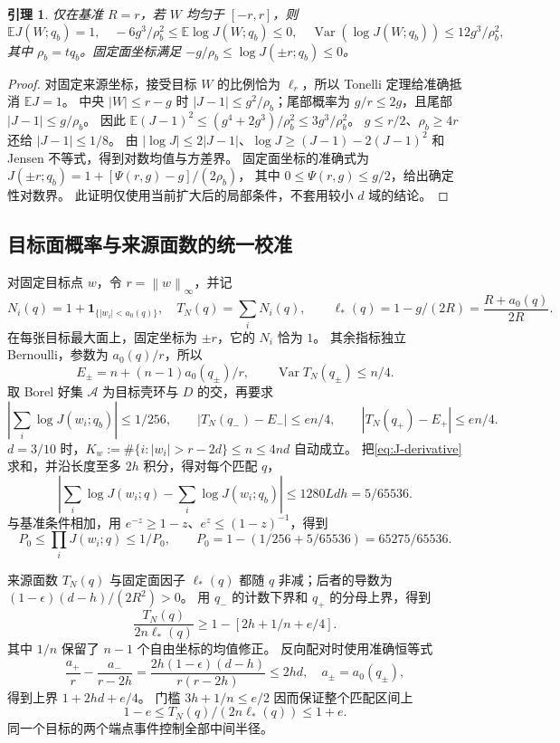 \documentclass[UTF8,a4paper,11pt,fontset=fandol]{ctexart}
\newtheorem{lemma}{引理}[section]
\theoremstyle{remark}
\newcommand{\one}{\mathbf 1}
\newcommand{\norm}[1]{\left\lVert#1\right\rVert}
\begin{document}
\begin{lemma}\label{lem:J-baseline}
仅在基准 $R=r$，若 $W$ 均匀于 $[-r,r]$，则
\[
 \mathbb EJ(W;q_b)=1,\quad
 -6g^3/\rho_b^2\le\mathbb E\log J(W;q_b)\le0,\quad
 \operatorname{Var}(\log J(W;q_b))\le12g^3/\rho_b^2,
\]
其中 $\rho_b=tq_b$。固定面坐标满足 $-g/\rho_b\le\log J(\pm r;q_b)\le0$。
\end{lemma}
\begin{proof}
对固定来源坐标，接受目标 $W$ 的比例恰为 $\ell_r$，所以 Tonelli 定理给准确抵消 $\mathbb EJ=1$。
中央 $|W|\le r-g$ 时 $|J-1|\le g^2/\rho_b$；尾部概率为 $g/r\le2g$，且尾部 $|J-1|\le g/\rho_b$。
因此 $\mathbb E(J-1)^2\le(g^4+2g^3)/\rho_b^2\le3g^3/\rho_b^2$。
$g\le r/2$、$\rho_b\ge4r$ 还给 $|J-1|\le1/8$。
由 $|\log J|\le2|J-1|$、$\log J\ge(J-1)-2(J-1)^2$ 和 Jensen 不等式，得到对数均值与方差界。
固定面坐标的准确式为 $J(\pm r;q_b)=1+[\Psi(r,g)-g]/(2\rho_b)$，
其中 $0\le\Psi(r,g)\le g/2$，给出确定性对数界。
此证明仅使用当前扩大后的局部条件，不套用较小 $d$ 域的结论。
\end{proof}

\subsection{目标面概率与来源面数的统一校准}\label{subsec:refined-target}
对固定目标点 $w$，令 $r=\norm w_\infty$，并记
\[
 N_i(q)=1+\one_{\{|w_i|<a_0(q)\}},\quad T_N(q)=\sum_iN_i(q),
 \qquad\ell_*(q)=1-g/(2R)=\frac{R+a_0(q)}{2R}.
\]
在每张目标最大面上，固定坐标为 $\pm r$，它的 $N_i$ 恰为 $1$。
其余指标独立 Bernoulli，参数为 $a_0(q)/r$，所以
\[
 E_\pm=n+(n-1)a_0(q_\pm)/r,\qquad
 \operatorname{Var}T_N(q_\pm)\le n/4.
\]
取 Borel 好集 $\mathcal A$ 为目标壳环与 $D$ 的交，再要求
\begin{equation}\label{eq:refined-target-events}
 \left|\sum_i\log J(w_i;q_b)\right|\le1/256,\qquad
 |T_N(q_-)-E_-|\le en/4,\qquad |T_N(q_+)-E_+|\le en/4.
\end{equation}
$d=3/10$ 时，$K_w:=\#\{i:|w_i|>r-2d\}\le n\le4nd$ 自动成立。
把\eqref{eq:J-derivative}求和，并沿长度至多 $2h$ 积分，得对每个匹配 $q$，
\[
 \left|\sum_i\log J(w_i;q)-\sum_i\log J(w_i;q_b)\right|
 \le1280Ldh=5/65536.
\]
与基准条件相加，用 $e^{-z}\ge1-z$、$e^z\le(1-z)^{-1}$，得到
\begin{equation}\label{eq:refined-product}
 P_0\le\prod_iJ(w_i;q)\le1/P_0,
 \qquad P_0=1-(1/256+5/65536)=65275/65536.
\end{equation}

来源面数 $T_N(q)$ 与固定面因子 $\ell_*(q)$ 都随 $q$ 非减；后者的导数为
$(1-\epsilon)(d-h)/(2R^2)>0$。
用 $q_-$ 的计数下界和 $q_+$ 的分母上界，得到
\[
 \frac{T_N(q)}{2n\ell_*(q)}\ge1-[2h+1/n+e/4].
\]
其中 $1/n$ 保留了 $n-1$ 个自由坐标的均值修正。
反向配对时使用准确恒等式
\[
 \frac{a_+}{r}-\frac{a_-}{r-2h}
 =\frac{2h(1-\epsilon)(d-h)}{r(r-2h)}\le2hd,
 \quad a_\pm=a_0(q_\pm),
\]
得到上界 $1+2hd+e/4$。
门槛 $3h+1/n\le e/2$ 因而保证整个匹配区间上
\begin{equation}\label{eq:calibrated-count}
 1-e\le T_N(q)/(2n\ell_*(q))\le1+e.
\end{equation}
同一个目标的两个端点事件控制全部中间半径。
\end{document}

